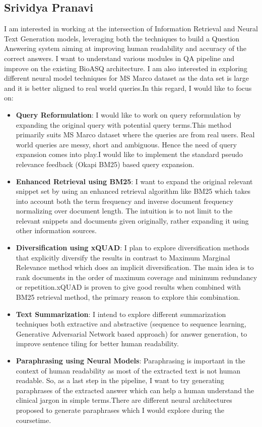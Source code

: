 \documentclass{article}
\begin{document}
\pagebreak

\subsection{Srividya Pranavi}
I am interested in working at the intersection of Information Retrieval and Neural Text Generation models, leveraging both the techniques to build a Question Answering system aiming at improving human readability and accuracy of the correct answers. I want to understand various modules in QA pipeline and improve on the existing BioASQ architecture. I am also interested in exploring different neural model techniques for MS Marco dataset as the data set is large and it is better aligned to real world queries.In this regard, I would like to focus on:
\begin{itemize}
    \item \textbf{Query Reformulation}: I would like to work on query reformulation by expanding the original query with potential query terms.This method primarily suits MS Marco dataset where the queries are from real users. Real world queries are messy, short and ambiguous. Hence the need of query expansion comes into play.I would like to implement the standard pseudo relevance feedback (Okapi BM25) based query expansion.
    \item \textbf{Enhanced Retrieval using BM25}: I want to expand the original relevant snippet set by using an enhanced retrieval algorithm like BM25 which takes into account both the term frequency and inverse document frequency normalizing over document length. The intuition is to not limit to the relevant snippets and documents given originally, rather expanding it using other information sources. 
    \item \textbf{Diversification using xQUAD}: I plan to explore diversification methods that explicitly diversify the results in contrast to Maximum Marginal Relevance method which does an implicit diversification. The main idea is to rank documents in the order of maximum coverage and minimum redundancy or repetition.xQUAD is proven to give good results when combined with BM25 retrieval method, the primary reason to explore this combination.
    \item \textbf{Text Summarization}: I intend to explore different summarization techniques both extractive and abstractive (sequence to sequence learning, Generative Adversarial Network based approach) for answer generation, to improve sentence tiling for better human readability.
    \item \textbf{Paraphrasing using Neural Models}: Paraphrasing is important in the context of human readability as most of the extracted text is not human readable. So, as a last step in the pipeline, I want to try generating paraphrases of the extracted answer which can help a human understand the clinical jargon in simple terms.There are different neural architectures proposed to generate paraphrases which I would explore during the coursetime.

\end{itemize}
\end{document}
